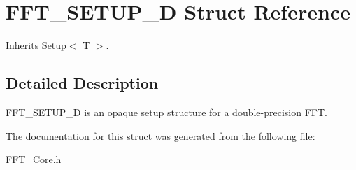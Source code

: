 \hypertarget{struct_double_setup}{}\section{F\+F\+T\+\_\+\+S\+E\+T\+U\+P\+\_\+D Struct Reference}
\label{struct_double_setup}


Inherits Setup$<$ T $>$.



\subsection{Detailed Description}
F\+F\+T\+\_\+\+S\+E\+T\+U\+P\+\_\+D is an opaque setup structure for a double-\/precision F\+FT. 

The documentation for this struct was generated from the following file\+:\begin{DoxyCompactItemize}
\item 
F\+F\+T\+\_\+\+Core.\+h\end{DoxyCompactItemize}
